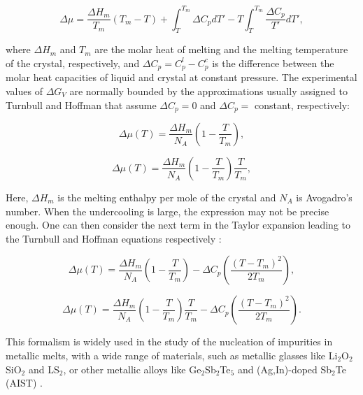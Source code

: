 \begin{equation}
    \Delta\mu = \frac{\Delta H_{m}}{T_{m}}(T_{m} - T) + \int_{T}^{T_{m}} \Delta C_{p} dT' - T \int_{T}^{T_{m}} \frac{\Delta C_{p}}{T'} dT',
\end{equation}

where \(\Delta H_{m}\) and \(T_{m}\) are the molar heat of melting and the melting temperature of the crystal, respectively, and \(\Delta C_{p} = C_{p}^{l} - C_{p}^{c}\) is the difference between the molar heat capacities of liquid and crystal at constant pressure. The experimental values of \(\Delta G_{V}\) are normally bounded by the approximations usually assigned to Turnbull and Hoffman that assume \(\Delta C_{p} = 0\) and \(\Delta C_{p} = \) constant, respectively:

\begin{equation}
    \Delta\mu(T) =  \frac{\Delta H_{m}}{N_A} \left( 1 - \frac{T}{T_{m}} \right),
\end{equation}

\begin{equation}
    \Delta\mu(T) = \frac{\Delta H_{m}}{N_A} \left( 1 - \frac{T}{T_{m}} \right) \frac{T}{T_{m}},
\end{equation}

Here, \(\Delta H_{m}\) is the melting enthalpy per mole of the crystal and \(N_A\) is Avogadro's number. When the undercooling is large, the expression may not be precise enough. One can then consider the next term in the Taylor expansion leading to the Turnbull and Hoffman equations respectively \cite{Clouet1}:

\begin{equation}
    \Delta\mu(T) = \frac{\Delta H_{m}}{N_A} \left( 1 - \frac{T}{T_{m}} \right)  - \Delta C_{p} \left( \frac{(T - T_{m})^2}{2T_{m}} \right),
\end{equation}

\begin{equation}
    \Delta\mu(T) =  \frac{\Delta H_{m}}{N_A} \left( 1 - \frac{T}{T_{m}} \right) \frac{T}{T_{m}}   - \Delta C_{p} \left( \frac{(T - T_{m})^2}{2T_{m}} \right).
\end{equation}

This formalism is widely used in the study of the nucleation of impurities in metallic melts, with a wide range of materials, such as metallic glasses like Li\(_2\)O\(_2\)SiO\(_2\) and LS\(_2\), or other metallic alloys like Ge\(_2\)Sb\(_2\)Te\(_5\) and (Ag,In)-doped Sb\(_2\)Te (AIST) \cite{Laszlo1, Neilson1979, Kelton1983, Laszlo3, Laszlo4, Sun2009}.

